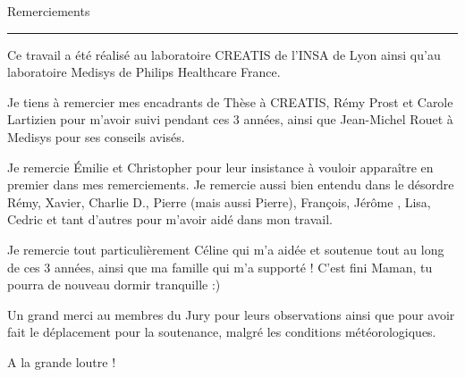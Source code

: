 {\fontsize{30}{100}\selectfont Remerciements}

\rule{15cm}{0.1em}

\vspace{1cm}

\thispagestyle{plain}

Ce travail a été réalisé au laboratoire CREATIS de l'INSA de Lyon ainsi qu'au laboratoire Medisys de Philips Healthcare France.

Je tiens à remercier mes encadrants de Thèse à CREATIS, Rémy Prost et Carole Lartizien pour m'avoir suivi pendant ces 3 années, ainsi que Jean-Michel Rouet à Medisys pour ses conseils avisés.

Je remercie \'Emilie et Christopher pour leur insistance à vouloir apparaître en premier dans mes remerciements. Je remercie aussi bien entendu dans le désordre Rémy, Xavier, Charlie D., Pierre (mais aussi Pierre), François, Jérôme , Lisa, Cedric et tant d'autres pour m'avoir aidé dans mon travail.

Je remercie tout particulièrement Céline qui m'a aidée et soutenue tout au long de ces 3 années, ainsi que ma famille qui m'a supporté ! C'est fini Maman, tu pourra de nouveau dormir tranquille :)

Un grand merci au membres du Jury pour leurs observations ainsi que pour avoir fait le déplacement pour la soutenance, malgré les conditions météorologiques.

A la grande loutre !